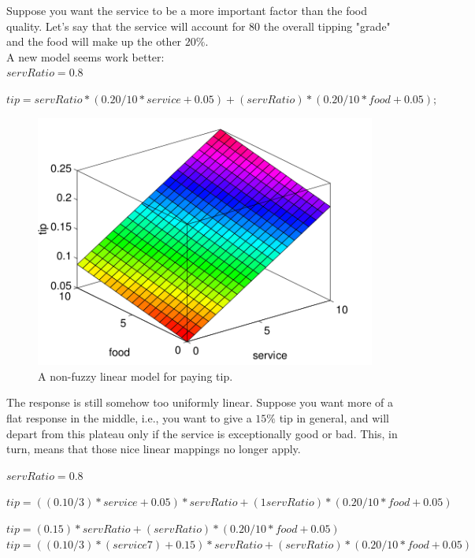 \documentclass{article}
\begin{document}
Suppose you want the service to be a more important
factor than the food quality. Let's say that the service will account for 80%
the overall tipping "grade" and the food will make up the other $20\%$.\\
A new model seems work better:\\

$servRatio=0.8$
\begin{center} 
$tip=servRatio*(0.20/10*service+0.05) +(servRatio)*(0.20/10*food+0.05);$
\end{center}

\begin{figure}[H]
\begin{center}
\includegraphics[scale=0.3]{./images/non-fuzzy_linear_tip.png}
\caption{A non-fuzzy linear model for paying tip.}
\label{non-fuzzy_linear_tip}
\end{center}
\end{figure}


The response is still somehow too uniformly linear. Suppose you want more of
a flat response in the middle, i.e., you want to give a $15\%$ tip in general, and
will depart from this plateau only if the service is exceptionally good or bad.
This, in turn, means that those nice linear mappings no longer apply.


$servRatio=0.8$
\begin{algorithmic}

	
	\State $tip=((0.10/3)*service+0.05)*servRatio +(1 servRatio)*(0.20/10*food+0.05)$

     \State $tip=(0.15)*servRatio +(servRatio)*(0.20/10*food+0.05)$
\Else 
	\State  $tip=((0.10/3)*(service 7)+0.15)*servRatio + (servRatio)*(0.20/10*food+0.05)$
   
\EndIf
\end{algorithmic}
\end{document}
